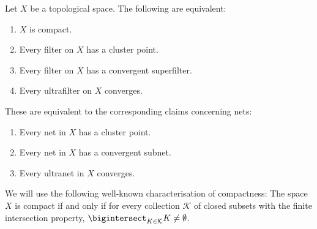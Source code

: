 \documentclass[article, a4paper, 11pt, oneside]{memoir}
\numberwithin{equation}{chapter}
\theoremstyle{nonumberplain}
\begin{document}
\newcommand{\calK}{\mathcal{K}}

\begin{proposition}
    Let $X$ be a topological space. The following are equivalent:
    \begin{enumerate}
        \item $X$ is compact.
        \item Every filter on $X$ has a cluster point.
        \item Every filter on $X$ has a convergent superfilter.
        \item Every ultrafilter on $X$ converges.
    \end{enumerate}
    These are equivalent to the corresponding claims concerning nets:
    \begin{enumerate}[resume]
        \item Every net in $X$ has a cluster point.
        \item Every net in $X$ has a convergent subnet.
        \item Every ultranet in $X$ converges.
    \end{enumerate}
\end{proposition}
%
We will use the following well-known characterisation of compactness: The space $X$ is compact if and only if for every collection $\calK$ of closed subsets with the finite intersection property, $\bigintersect_{K \in \calK} K \neq \emptyset$.
\end{document}

